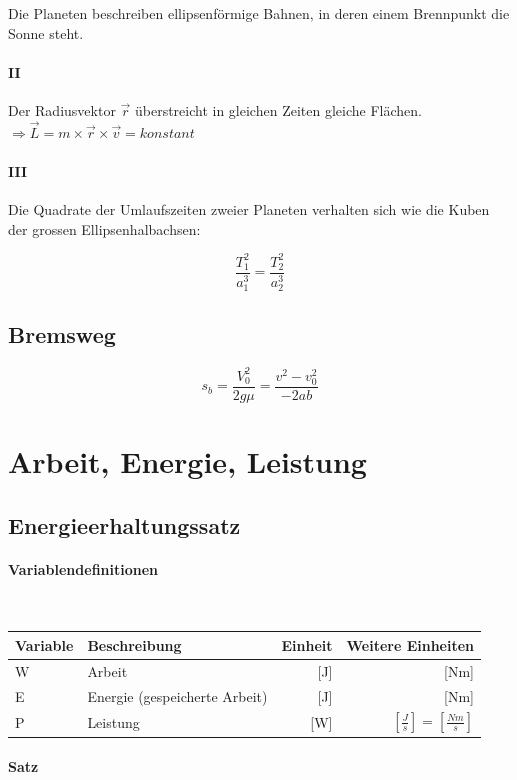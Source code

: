 \documentclass[a4paper,10pt]{article}
\newcommand{\lbparagraph}[1]{\paragraph{#1}\mbox{}\\}
\begin{document}
Die Planeten beschreiben ellipsenförmige Bahnen, in deren einem Brennpunkt die Sonne steht.

\paragraph{II}

Der Radiusvektor $\vec{r}$ überstreicht in gleichen Zeiten gleiche Flächen. $\Rightarrow \vec{L} = m \times \vec{r} \times \vec{v} = konstant$

\paragraph{III}

Die Quadrate der Umlaufszeiten zweier Planeten verhalten sich wie die Kuben der grossen Ellipsenhalbachsen:

\begin{equation}
    \frac{T_1^2}{a_1^3} = \frac{T_2^2}{a_2^3}
\end{equation}

\subsection{Bremsweg}

\begin{equation}
    s_b = \frac{V_0^2}{2g\mu} = \frac{v^2 - v_0^2}{-2ab}
\end{equation}

\section{Arbeit, Energie, Leistung}

\subsection{Energieerhaltungssatz}

\lbparagraph{Variablendefinitionen}

\begin{tabular}{l|l|r|r}
    Variable & Beschreibung & Einheit & Weitere Einheiten \\
    \hline
    W & Arbeit & [J] & [Nm]  \\
    E & Energie (gespeicherte Arbeit) & [J] & [Nm] \\
    P & Leistung & [W] & $[\frac{J}{s}] = [\frac{Nm}{s}]$
\end{tabular}

\lbparagraph{Satz}
\end{document}

